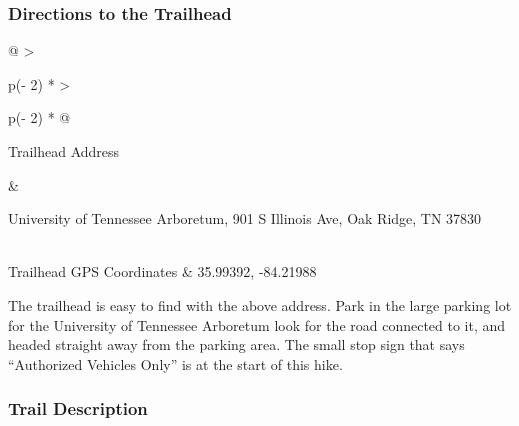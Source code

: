 \documentclass[
  letterpaper,
  DIV=11,
  numbers=noendperiod]{scrartcl}
\begin{document}
\hypertarget{directions-to-the-trailhead-4}{%
\subsubsection{Directions to the
Trailhead}\label{directions-to-the-trailhead-4}}

\begin{longtable}[]{@{}
  >{\raggedright\arraybackslash}p{(\columnwidth - 2\tabcolsep) * }
  >{\raggedright\arraybackslash}p{(\columnwidth - 2\tabcolsep) * }@{}}
\toprule\noalign{}
\begin{minipage}[b]{\linewidth}\raggedright
Trailhead Address
\end{minipage} & \begin{minipage}[b]{\linewidth}\raggedright
University of Tennessee Arboretum, 901 S Illinois Ave, Oak Ridge, TN
37830
\end{minipage} \\
\midrule\noalign{}
\endhead
\bottomrule\noalign{}
\endlastfoot
Trailhead GPS Coordinates & 35.99392, -84.21988 \\
\end{longtable}

The trailhead is easy to find with the above address. Park in the large
parking lot for the University of Tennessee Arboretum look for the road
connected to it, and headed straight away from the parking area. The
small stop sign that says ``Authorized Vehicles Only'' is at the start
of this hike.

\hypertarget{trail-description-4}{%
\subsubsection{Trail Description}\label{trail-description-4}}
\end{document}
